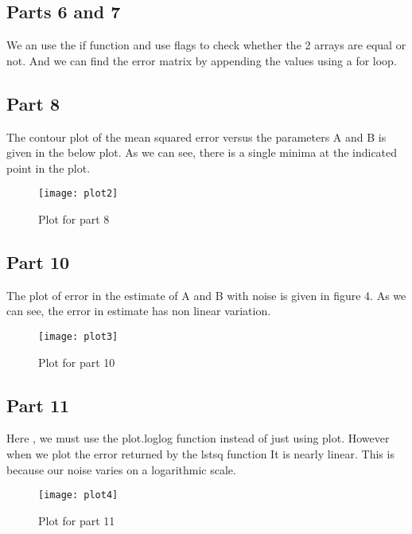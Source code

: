 \documentclass[11pt, a4paper]{article}
\begin{document}
\subsection*{Parts 6 and 7}
We an use the if function and use flags to check whether the 2 arrays are equal or not. And we can find the error matrix by appending the values using a for loop.

\subsection*{Part 8}

The contour plot of the mean squared error versus the parameters A and B
is given in the below plot. As we can see, there is a single minima at the indicated point in the plot.

\begin{figure}[!tbh]
	\centering
	\texttt{[image: plot2]}
	\caption{Plot for part 8}
	\label{fig:plot2}
\end{figure}

\subsection*{Part 10}
The plot of error in the estimate of A and B with noise is given in figure 4.
As we can see, the error in estimate has non linear variation.
\begin{figure}[!tbh]
	\centering
	\texttt{[image: plot3]}
	\caption{Plot for part 10}
	\label{fig:plot3}
\end{figure}

\subsection*{Part 11}
Here , we must use the plot.loglog function instead of just using plot.
However when we plot the error returned by the lstsq function It is nearly linear. This is because our noise varies on a logarithmic scale.
\begin{figure}[!tbh]
	\centering
	\texttt{[image: plot4]}
	\caption{Plot for part 11}
	\label{fig:plot4}
\end{figure}
\end{document}
